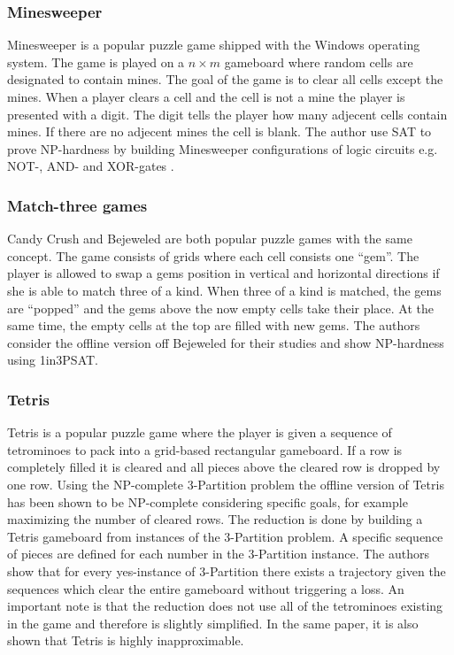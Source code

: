 \subsubsection{Minesweeper}
Minesweeper is a popular puzzle game shipped with the Windows operating system. The game is played on a $n \times m$ gameboard where random cells are designated to contain mines. The goal of the game is to clear all cells except the mines. When a player clears a cell and the cell is not a mine the player is presented with a digit. The digit tells the player how many adjecent cells contain mines. If there are no adjecent mines the cell is blank. The author use SAT to prove NP-hardness by building Minesweeper configurations of logic circuits e.g. NOT-, AND- and XOR-gates \cite{minesweeper}.

\subsubsection{Match-three games}

Candy Crush and Bejeweled are both popular puzzle games with the same concept. The game consists of grids where each cell consists one ``gem''. The player is allowed to swap a gems position in vertical and horizontal directions if she is able to match three of a kind. When three of a kind is matched, the gems are ``popped'' and the gems above the now empty cells take their place. At the same time, the empty cells at the top are filled with new gems. The authors consider the offline version off Bejeweled for their studies and show NP-hardness using 1in3PSAT. \cite{candy}

\subsubsection{Tetris}

Tetris is a popular puzzle game where the player is given a sequence of tetrominoes to pack into a grid-based rectangular gameboard. If a row is completely filled it is cleared and all pieces above the cleared row is dropped by one row. Using the NP-complete 3-Partition problem the offline version of Tetris has been shown to be NP-complete considering specific goals, for example maximizing the number of cleared rows. The reduction is done by building a Tetris gameboard from instances of the 3-Partition problem. A specific sequence of pieces are defined for each number in the 3-Partition instance. The authors show that for every yes-instance of 3-Partition there exists a trajectory given the sequences which clear the entire gameboard without triggering a loss. An important note is that the reduction does not use all of the tetrominoes existing in the game and therefore is slightly simplified. In the same paper, it is also shown that Tetris is highly inapproximable. 

